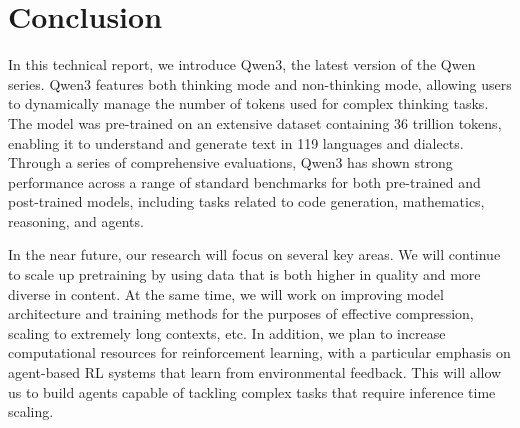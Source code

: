 

\section{Conclusion}

In this technical report, we introduce Qwen3, the latest version of the Qwen series. Qwen3 features both thinking mode and non-thinking mode, allowing users to dynamically manage the number of tokens used for complex thinking tasks. The model was pre-trained on an extensive dataset containing 36 trillion tokens, enabling it to understand and generate text in 119 languages and dialects. Through a series of comprehensive evaluations, Qwen3 has shown strong performance across a range of standard benchmarks for both pre-trained and post-trained models, including tasks related to code generation, mathematics, reasoning, and agents.

In the near future, our research will focus on several key areas. We will continue to scale up pretraining by using data that is both higher in quality and more diverse in content. At the same time, we will work on improving model architecture and training methods for the purposes of effective compression, scaling to extremely long contexts, etc.
In addition, we plan to increase computational resources for reinforcement learning, with a particular emphasis on agent-based RL systems that learn from environmental feedback. This will allow us to build agents capable of tackling complex tasks that require inference time scaling.
